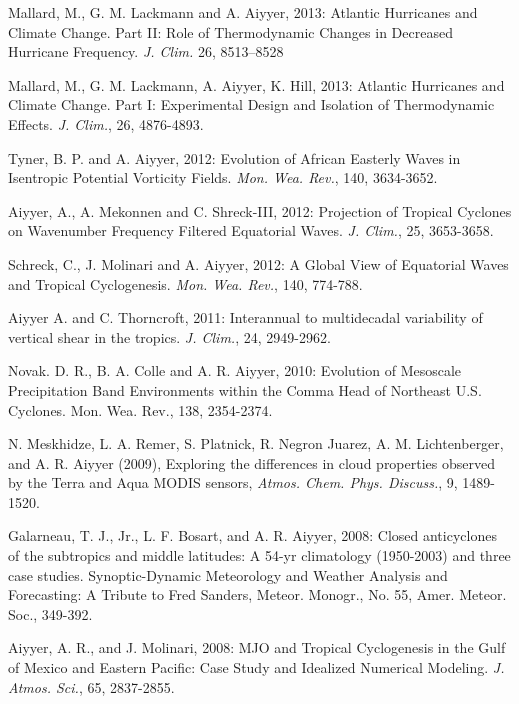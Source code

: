 \begin{ilist}
\item Mallard, M., G. M. Lackmann and A. Aiyyer, 2013: Atlantic Hurricanes and Climate Change. Part II: Role of Thermodynamic Changes in Decreased Hurricane Frequency. \emph{J. Clim.} 26, 8513–8528

\item Mallard, M., G. M. Lackmann, A. Aiyyer, K. Hill, 2013: Atlantic Hurricanes and Climate Change. Part I: Experimental Design and Isolation of Thermodynamic Effects. \emph{J. Clim.}, 26, 4876-4893.

\item Tyner, B. P. and A. Aiyyer, 2012: Evolution of African Easterly Waves in Isentropic Potential Vorticity Fields. \emph{Mon. Wea. Rev.}, 140, 3634-3652.

\item Aiyyer, A., A. Mekonnen and C. Shreck-III, 2012: Projection of Tropical Cyclones on Wavenumber Frequency Filtered Equatorial Waves. \emph{J. Clim.}, 25, 3653-3658.

\item Schreck, C., J. Molinari and A. Aiyyer, 2012: A Global View of Equatorial Waves and Tropical Cyclogenesis. \emph{Mon. Wea. Rev.}, 140, 774-788.


\item Aiyyer A. and C. Thorncroft, 2011: Interannual to multidecadal variability of vertical shear in the tropics. \emph{J. Clim.}, 24, 2949-2962.

\item Novak. D. R., B. A. Colle and A. R. Aiyyer, 2010: Evolution of Mesoscale Precipitation Band Environments within the Comma Head of Northeast U.S. Cyclones. Mon. Wea. Rev., 138, 2354-2374. 

\item N. Meskhidze, L. A. Remer, S. Platnick, R. Negron Juarez, A. M. Lichtenberger, and A. R. Aiyyer (2009), Exploring the differences in cloud properties observed by the Terra and Aqua MODIS sensors, \emph{Atmos. Chem. Phys. Discuss.}, 9, 1489-1520.

\item Galarneau, T. J., Jr., L. F. Bosart, and A. R. Aiyyer, 2008: Closed anticyclones of the subtropics and middle latitudes: A 54-yr climatology (1950-2003) and three case studies. Synoptic-Dynamic Meteorology and Weather Analysis and Forecasting: A Tribute to Fred Sanders, Meteor. Monogr., No. 55, Amer. Meteor. Soc., 349-392.

\item Aiyyer, A. R., and J. Molinari, 2008: MJO and Tropical Cyclogenesis in the Gulf of Mexico and Eastern Pacific: Case Study and Idealized Numerical Modeling. \emph{J. Atmos. Sci.}, 65, 2837-2855. 


\end{ilist}
